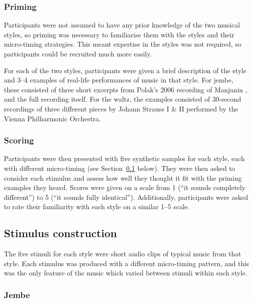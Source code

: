 \documentclass[12pt,twoside,openright]{report}
\begin{document}
\subsubsection{Priming} \label{priming}

Participants were not assumed to have any prior knowledge of the two musical
styles, so priming was necessary to familiarise them with the styles and their
micro-timing strategies. This meant expertise in the styles was not required, so
participants could be recruited much more easily.

For each of the two styles, participants were given a brief description of the
style and 3--4 examples of real-life performances of music in that style. For
jembe, these consisted of three short excerpts from Polak's 2006 recording of
Manjanin \cite{polak2010}, and the full recording itself. For the waltz, the examples consisted of
30-second recordings of three different pieces by Johann Strauss I \& II
performed by the Vienna Philharmonic Orchestra.

\subsubsection{Scoring} \label{scoring}

Participants were then presented with five synthetic samples for each style,
each with different micro-timing (see Section~\ref{stimulus_construction} below). They were then asked to consider each stimulus and assess how
well they thought it fit with the priming examples they heard. Scores were given
on a scale from 1 (``it sounds completely different'') to 5 (``it sounds fully
identical''). Additionally, participants were asked to rate their familiarity with each style on a similar 1--5 scale.


\subsection{Stimulus construction} \label{stimulus_construction}

The five stimuli for each style were short audio clips of typical music from that style. Each stimulus was produced with a different micro-timing pattern, and this was the only feature of the music which varied between stimuli within each style.

\subsubsection{Jembe} \label{jembe_stimuli}
\end{document}

